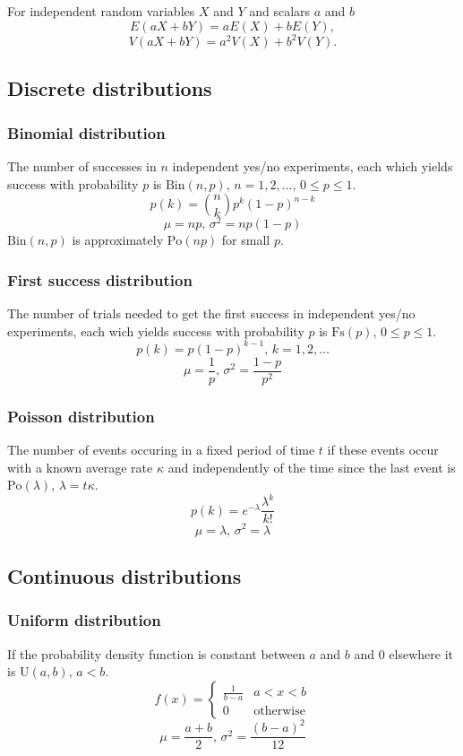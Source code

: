 For independent random variables $X$ and $Y$ and scalars $a$ and $b$
$$E(aX+bY) = aE(X)+bE(Y),$$
$$V(aX+bY) = a^2V(X)+b^2V(Y).$$

\subsection{Discrete distributions}

\subsubsection{Binomial distribution}
The number of successes in $n$ independent yes/no experiments, each which yields success with probability $p$ is $\textrm{Bin}(n,p),\,n=1,2,\dots,\, 0\leq p\leq1$.
$$p(k)={n\choose k}p^k(1-p)^{n-k}$$
$$\mu = np,\,\sigma^2=np(1-p)$$
$\textrm{Bin}(n,p)$ is approximately $\textrm{Po}(np)$ for small $p$.

\subsubsection{First success distribution}
The number of trials needed to get the first success in independent yes/no experiments, each wich yields success with probability $p$ is $\textrm{Fs}(p),\,0\leq p\leq1$.
$$p(k)=p(1-p)^{k-1},\,k=1,2,\dots$$
$$\mu = \frac1p,\,\sigma^2=\frac{1-p}{p^2}$$

\subsubsection{Poisson distribution}
The number of events occuring in a fixed period of time $t$ if these events occur with a known average rate $\kappa$ and independently of the time since the last event is $\textrm{Po}(\lambda),\,\lambda=t\kappa$.
$$p(k)=e^{-\lambda}\frac{\lambda^k}{k!}$$
$$\mu=\lambda,\,\sigma^2=\lambda$$

\subsection{Continuous distributions}

\subsubsection{Uniform distribution}
If the probability density function is constant between $a$ and $b$ and 0 elsewhere it is $\textrm{U}(a,b),\,a<b$.
$$f(x) = \left\{
\begin{array}{cl}
\frac{1}{b-a} & a<x<b\\
0 & \textrm{otherwise}
\end{array}\right.$$
$$\mu=\frac{a+b}{2},\,\sigma^2=\frac{(b-a)^2}{12}$$

